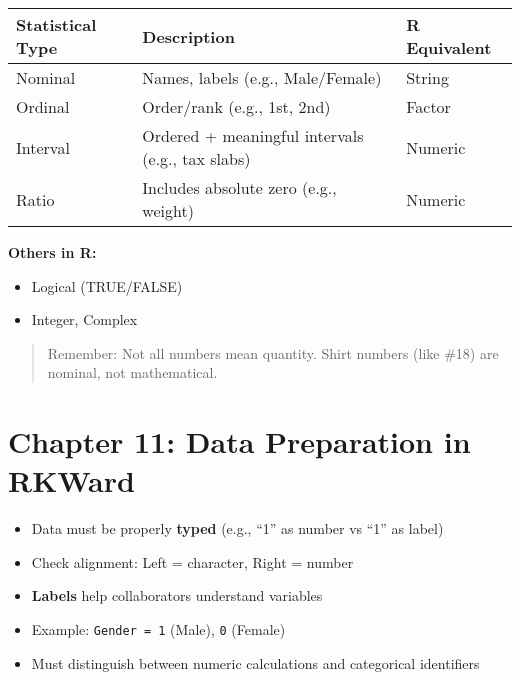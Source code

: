 \documentclass[
  letterpaper,
  DIV=11,
  numbers=noendperiod]{scrreprt}
\providecommand{\tightlist}{%
  \setlength{\itemsep}{0pt}\setlength{\parskip}{0pt}}
\begin{document}
\begin{longtable}[]{@{}
  >{\raggedright\arraybackslash}p{}
  >{\raggedright\arraybackslash}p{}
  >{\raggedright\arraybackslash}p{}@{}}
\toprule\noalign{}
\begin{minipage}[b]{\linewidth}\raggedright
Statistical Type
\end{minipage} & \begin{minipage}[b]{\linewidth}\raggedright
Description
\end{minipage} & \begin{minipage}[b]{\linewidth}\raggedright
R Equivalent
\end{minipage} \\
\midrule\noalign{}
\endhead
\bottomrule\noalign{}
\endlastfoot
Nominal & Names, labels (e.g., Male/Female) & String \\
Ordinal & Order/rank (e.g., 1st, 2nd) & Factor \\
Interval & Ordered + meaningful intervals (e.g., tax slabs) & Numeric \\
Ratio & Includes absolute zero (e.g., weight) & Numeric \\
\end{longtable}

\textbf{Others in R:}

\begin{itemize}
\tightlist
\item
  Logical (TRUE/FALSE)\\
\item
  Integer, Complex
\end{itemize}

\begin{quote}
Remember: Not all numbers mean quantity. Shirt numbers (like \#18) are
nominal, not mathematical.
\end{quote}


\chapter{Chapter 11: Data Preparation in
RKWard}\label{chapter-11-data-preparation-in-rkward}

\begin{itemize}
\tightlist
\item
  Data must be properly \textbf{typed} (e.g., ``1'' as number vs ``1''
  as label)\\
\item
  Check alignment: Left = character, Right = number\\
\item
  \textbf{Labels} help collaborators understand variables\\
\item
  Example: \texttt{Gender\ =\ 1} (Male), \texttt{0} (Female)\\
\item
  Must distinguish between numeric calculations and categorical
  identifiers
\end{itemize}
\end{document}
